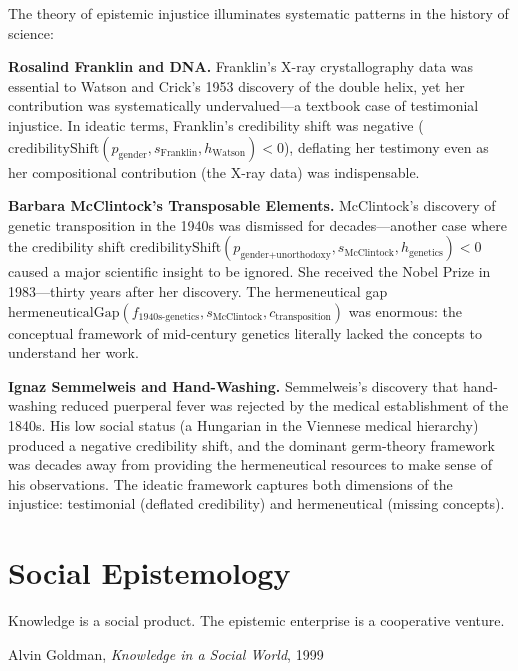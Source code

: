\begin{remark}
The theory of epistemic injustice illuminates systematic patterns in the history
of science:

\textbf{Rosalind Franklin and DNA.} Franklin's X-ray crystallography data was
essential to Watson and Crick's 1953 discovery of the double helix, yet her
contribution was systematically undervalued---a textbook case of testimonial
injustice. In ideatic terms, Franklin's credibility shift was negative
($\mathrm{credibilityShift}(p_{\text{gender}}, s_{\text{Franklin}}, h_{\text{Watson}}) < 0$),
deflating her testimony even as her compositional contribution (the X-ray data)
was indispensable.

\textbf{Barbara McClintock's Transposable Elements.} McClintock's discovery
of genetic transposition in the 1940s was dismissed for decades---another case
where the credibility shift $\mathrm{credibilityShift}(p_{\text{gender+unorthodoxy}},
s_{\text{McClintock}}, h_{\text{genetics}}) < 0$ caused a major scientific insight
to be ignored. She received the Nobel Prize in 1983---thirty years after her
discovery. The hermeneutical gap $\mathrm{hermeneuticalGap}(f_{\text{1940s-genetics}},
s_{\text{McClintock}}, c_{\text{transposition}})$ was enormous: the conceptual
framework of mid-century genetics literally lacked the concepts to understand her
work.

\textbf{Ignaz Semmelweis and Hand-Washing.} Semmelweis's discovery that
hand-washing reduced puerperal fever was rejected by the medical establishment
of the 1840s. His low social status (a Hungarian in the Viennese medical hierarchy)
produced a negative credibility shift, and the dominant germ-theory framework was
decades away from providing the hermeneutical resources to make sense of his
observations. The ideatic framework captures both dimensions of the injustice:
testimonial (deflated credibility) and hermeneutical (missing concepts).
\end{remark}


\chapter{Social Epistemology}
\label{ch:social-epistemology}

\epigraph{Knowledge is a social product. The epistemic enterprise is a cooperative venture.}{Alvin Goldman, \textit{Knowledge in a Social World}, 1999}

